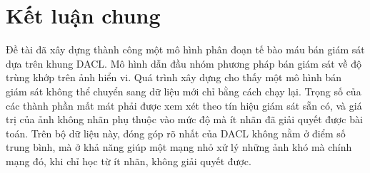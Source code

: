 \section{Kết luận chung}

Đề tài đã xây dựng thành công một mô hình phân đoạn tế bào máu bán giám sát dựa trên khung DACL. Mô hình dẫn đầu nhóm phương pháp bán giám sát về độ trùng khớp trên ảnh hiển vi. Quá trình xây dựng cho thấy một mô hình bán giám sát không thể chuyển sang dữ liệu mới chỉ bằng cách chạy lại. Trọng số của các thành phần mất mát phải được xem xét theo tín hiệu giám sát sẵn có, và giá trị của ảnh không nhãn phụ thuộc vào mức độ mà ít nhãn đã giải quyết được bài toán. Trên bộ dữ liệu này, đóng góp rõ nhất của DACL không nằm ở điểm số trung bình, mà ở khả năng giúp một mạng nhỏ xử lý những ảnh khó mà chính mạng đó, khi chỉ học từ ít nhãn, không giải quyết được.

